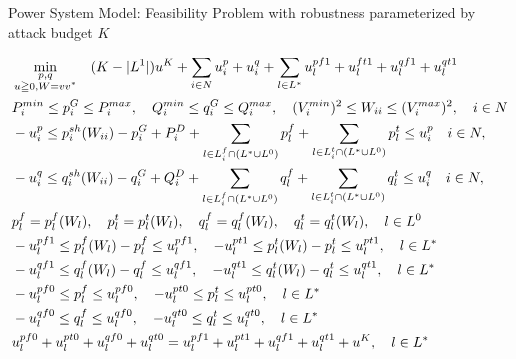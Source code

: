 \documentclass[xcolor=dvipsnames]{beamer}
\newcommand{\p}[1]{p^{#1}}
\newcommand{\q}[1]{q^{#1}}
\newcommand{\ii}{i}
\newcommand{\llll}{l}
\newcommand{\from}{f}
\newcommand{\tto}{t}
\newcommand{\WW}{W}
\newcommand{\Lines}{L}
\begin{document}
\begin{frame}{Power System Model: Feasibility Problem with robustness parameterized by attack budget $K$}
\begin{footnotesize}
\begin{subequations}
\begin{align}
&\min_{\substack{p,q\\ u \geqq 0,W=vv^*}} \quad 
  (K-|L^1|) u^K + \sum_{i \in N} u_i^p + u_i^q + \sum_{l \in L^*} u_l^{pf1} + u_l^{ft1} + u_l^{qf1} + u_l^{qt1}  \notag \\
  & P_i^{min} \leq p_i^G \leq P_i^{max}, \quad Q_i^{min} \leq q_i^G \leq Q_i^{max}, \quad (V_i^{min})^2 \leq W_{ii} \leq (V_i^{max})^2,\quad i\in N \notag \\
  & -u_i^p \le p_i^{sh}(\WW_{ii}) - p^G_i + P^D_i 
	+ \sum_{\llll \in \Lines_\ii^{\from} \cap (L^* \cup L^0)  } p_{l}^{f}  
	+\sum_{\llll \in \Lines_\ii^{\tto} \cap (L^* \cup L^0) } p_{l}^{t} 
	\le u_i^p \quad i\in N, \notag\\ 
  & -u_i^q \le q_i^{sh}(\WW_{ii}) - q^G_i + Q^D_i 
	+ \sum_{\llll \in \Lines_\ii^{\from} \cap (L^* \cup L^0) } q_{l}^{f}
	+ \sum_{\llll \in \Lines_\ii^{\tto} \cap (L^* \cup L^0) } q_{l}^{t} 
	\le u_i^q \quad i\in N, \notag \\
& p_{l}^{f}=\p{\from}_{\llll}(\WW_\llll),\quad p_l^t=\p{\tto}_{\llll}(\WW_\llll),\quad q_l^f=\q{\from}_{\llll}(\WW_\llll),\quad q_l^t=\q{\tto}_{\llll}(\WW_\llll) , \quad \llll \in L^0 \notag \\
& -u_l^{pf1} \le \p{\from}_{\llll}(\WW_\llll) - p_{l}^{f} \le u_l^{pf1}, \quad
 -u_l^{pt1} \le \p{\tto}_{\llll}(\WW_\llll)  - p_{l}^{t} \le u_l^{pt1}, \quad \llll \in L^* \notag \\
& -u_l^{qf1} \le \q{\from}_{\llll}(\WW_\llll) - q_{l}^{f} \le u_l^{qf1}, \quad 
 -u_l^{qt1} \le \q{\tto}_{\llll}(\WW_\llll)  - q_{l}^{t} \le u_l^{qt1}, \quad \llll \in L^* \notag \\
& -u_l^{pf0} \le p_l^f \le u_l^{pf0},\quad-u_l^{pt0} \le p_l^t \le u_l^{pt0}, \quad l \in L^* \notag\\ 
& -u_l^{qf0} \le q_l^f \le u_l^{qf0},\quad-u_l^{qt0} \le q_l^t \le u_l^{qt0}, \quad l \in L^* \notag \\
& u_l^{pf0} + u_l^{pt0} + u_l^{qf0} + u_l^{qt0} = u_l^{pf1} + u_l^{pt1} + u_l^{qf1} + u_l^{qt1} + u^K,\quad l \in L^* \notag
\end{align}
\end{subequations}
\end{footnotesize}
\end{frame}
\end{document}
